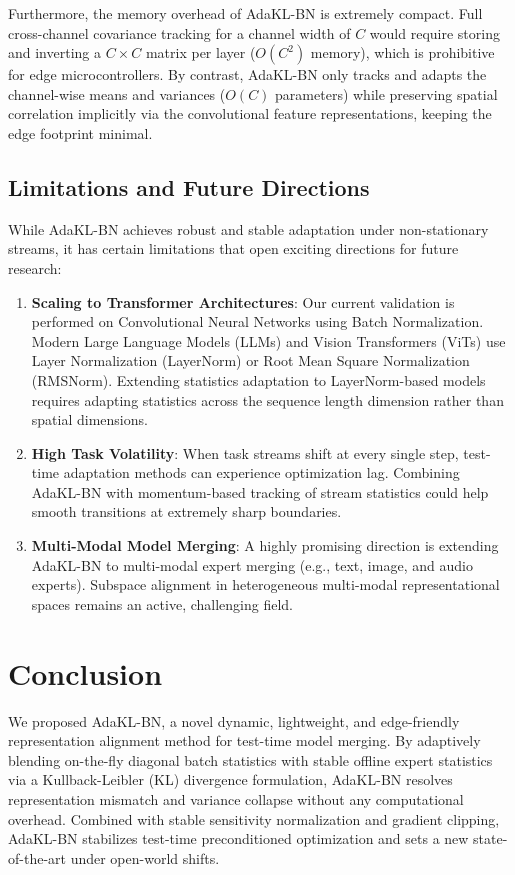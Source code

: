 \documentclass{article}
\begin{document}
Furthermore, the memory overhead of AdaKL-BN is extremely compact. Full cross-channel covariance tracking for a channel width of $C$ would require storing and inverting a $C \times C$ matrix per layer ($O(C^2)$ memory), which is prohibitive for edge microcontrollers. By contrast, AdaKL-BN only tracks and adapts the channel-wise means and variances ($O(C)$ parameters) while preserving spatial correlation implicitly via the convolutional feature representations, keeping the edge footprint minimal.

\subsection{Limitations and Future Directions}
While AdaKL-BN achieves robust and stable adaptation under non-stationary streams, it has certain limitations that open exciting directions for future research:
\begin{enumerate}
    \item \textbf{Scaling to Transformer Architectures}: Our current validation is performed on Convolutional Neural Networks using Batch Normalization. Modern Large Language Models (LLMs) and Vision Transformers (ViTs) use Layer Normalization (LayerNorm) or Root Mean Square Normalization (RMSNorm). Extending statistics adaptation to LayerNorm-based models requires adapting statistics across the sequence length dimension rather than spatial dimensions.
    \item \textbf{High Task Volatility}: When task streams shift at every single step, test-time adaptation methods can experience optimization lag. Combining AdaKL-BN with momentum-based tracking of stream statistics could help smooth transitions at extremely sharp boundaries.
    \item \textbf{Multi-Modal Model Merging}: A highly promising direction is extending AdaKL-BN to multi-modal expert merging (e.g., text, image, and audio experts). Subspace alignment in heterogeneous multi-modal representational spaces remains an active, challenging field.
\end{enumerate}

\section{Conclusion}
\label{sec:conclusion}
We proposed AdaKL-BN, a novel dynamic, lightweight, and edge-friendly representation alignment method for test-time model merging. By adaptively blending on-the-fly diagonal batch statistics with stable offline expert statistics via a Kullback-Leibler (KL) divergence formulation, AdaKL-BN resolves representation mismatch and variance collapse without any computational overhead. Combined with stable sensitivity normalization and gradient clipping, AdaKL-BN stabilizes test-time preconditioned optimization and sets a new state-of-the-art under open-world shifts.

\clearpage


\end{document}
